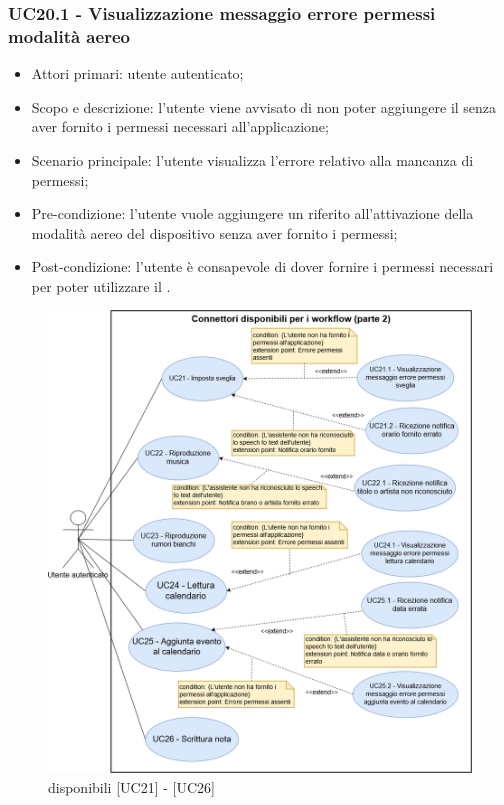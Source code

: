 \subsubsection{UC20.1 - Visualizzazione messaggio errore permessi modalità aereo}
\begin{itemize}
	\item  Attori primari: utente autenticato;
	\item  Scopo e descrizione: l'utente viene avvisato di non poter aggiungere il  senza aver fornito i permessi necessari all'applicazione;
	\item  Scenario principale: l'utente visualizza l'errore relativo alla mancanza di permessi;
	\item  Pre-condizione: l'utente vuole aggiungere un  riferito all'attivazione della modalità aereo del dispositivo  senza aver fornito i permessi;
	\item  Post-condizione: l'utente è consapevole di dover fornire i permessi necessari per poter utilizzare il .
\end{itemize}

\begin{figure}[H]
	\centering
	\includegraphics[width=15cm,keepaspectratio]{../includes/pics/wf2.png}
	\caption{\label{fig:mission} disponibili [UC21] - [UC26]}
\end{figure}
\clearpage
